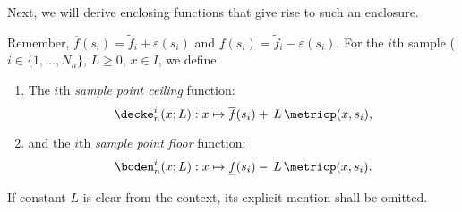 Next, we will derive enclosing functions that give rise to such an enclosure.

\begin{defn}
\label{def:sampleceilandfloormultidim}
Remember, $\overline f(s_i) = \tilde f_i + \varepsilon(s_i)$ and $\underline f(s_i) = \tilde f_i - \varepsilon(s_i)$.  For the $i$th sample ($i \in \{1,\ldots,N_n\}$, $L \geq 0$, $x \in I$, we define  
\begin{enumerate}
	\item The $i$th \emph{sample point ceiling} function: \[\decke_n^i (x; L) :x \mapsto  \overline f (s_i) +  \,L \, \metricp(x, s_i), \]
	\item and the $i$th \emph{sample point floor} function: \[\boden_n^i (x; L) :x \mapsto  \underline f (s_i) -  \,L \, \metricp(x, s_i) .\] 
\end{enumerate}
If constant $L$ is clear from the context, its explicit mention shall be omitted.
\end{defn}


